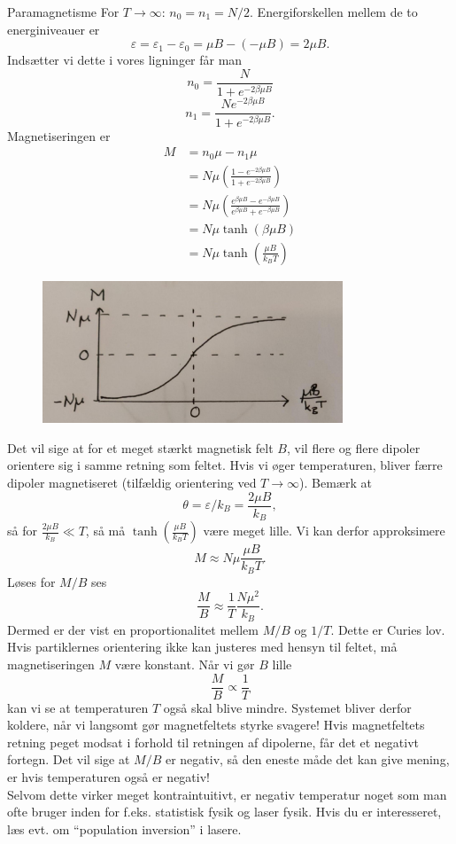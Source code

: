 \begin{opgave}{Paramagnetisme}
    For $T\to\infty$: $n_0=n_1=N/2$.
    \opg Energiforskellen mellem de to energiniveauer er
    \[ \varepsilon=\varepsilon_1-\varepsilon_0=\mu B-(-\mu B)=2\mu B. \]
    Indsætter vi dette i vores ligninger får man
    \[ n_0=\frac{N}{1+e^{-2\beta\mu B}} \]
    \[ n_1=\frac{Ne^{-2\beta\mu B}}{1+e^{-2\beta\mu B}}. \]
    Magnetiseringen er
    \begin{align*}
        M&= n_0\mu-n_1\mu\\
        &=N\mu\left(\frac{1-e^{-2\beta\mu B}}{1+e^{-2\beta\mu B}}\right)\\
        &=N\mu\left(\frac{e^{\beta\mu B}-e^{-\beta\mu B}}{e^{\beta\mu B}+e^{-\beta\mu B}}\right)\\
        &=N\mu\tanh(\beta\mu B)\\
        &=N\mu\tanh\left(\frac{\mu B}{k_BT}\right)
    \end{align*}
    \opg
    \begin{figure}[H]
        \centering
        \includegraphics[width=0.8\textwidth]{facit/figurer/statfys/statfys_opg7,7.jpg}
    \end{figure}
    Det vil sige at for et meget stærkt magnetisk felt $B$, vil flere og flere dipoler orientere sig i samme retning som feltet. Hvis vi øger temperaturen, bliver færre dipoler magnetiseret (tilfældig orientering ved $T\to\infty$).
    \opg Bemærk at
    \[ \theta=\varepsilon/k_B=\frac{2\mu B}{k_B}, \]
    så for $\frac{2\mu B}{k_B}\ll T$, så må $\tanh\left(\frac{\mu B}{k_BT}\right)$ være meget lille. Vi kan derfor approksimere
    \[ M\approx N\mu\frac{\mu B}{k_BT}. \]
    Løses for $M/B$ ses
    \[ \frac{M}{B}\approx\frac{1}{T}\frac{N\mu^2}{k_B}. \]
    Dermed er der vist en proportionalitet mellem $M/B$ og $1/T$. Dette er Curies lov.
    \opg Hvis partiklernes orientering ikke kan justeres med hensyn til feltet, må magnetiseringen $M$ være konstant. Når vi gør $B$ lille
    \[ \frac{M}{B}\propto\frac{1}{T}\]
    kan vi se at temperaturen $T$ også skal blive mindre. Systemet bliver derfor koldere, når vi langsomt gør magnetfeltets styrke svagere!
    \opg Hvis magnetfeltets retning peget modsat i forhold til retningen af dipolerne, får det et negativt fortegn. Det vil sige at $M/B$ er negativ, så den eneste måde det kan give mening, er hvis temperaturen også er negativ!\\
    Selvom dette virker meget kontraintuitivt, er negativ temperatur noget som man ofte bruger inden for f.eks. statistisk fysik og laser fysik. Hvis du er interesseret, læs evt. om ``population inversion'' i lasere.
\end{opgave}

